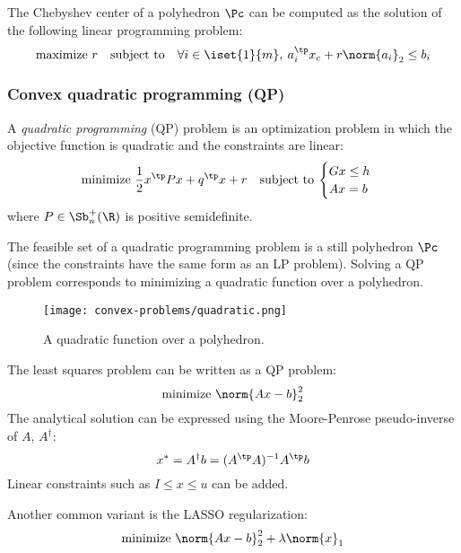 \begin{property}
    The Chebyshev center of a polyhedron $\Pc$ can be computed as the solution of the following linear programming problem:
    \begin{equation*}
        \text{maximize } r \quad\text{subject to}\quad \forall i\in\iset{1}{m}, \: a_i^\tp x_c + r\norm{a_i}_2\leq b_i
    \end{equation*}
\end{property}

\subsubsection{Convex quadratic programming (QP)}
\begin{definition}
    A \emph{quadratic programming} (QP) problem is an optimization problem in which the objective function is quadratic and the constraints are linear:
    \begin{equation*}
        \text{minimize } \frac{1}{2}x^\tp P x + q^\tp x + r\quad\text{subject to}\: \begin{cases}
            Gx\leq h\\
            Ax=b
        \end{cases}
    \end{equation*}
    where $P\in\Sb_n^+(\R)$ is positive semidefinite.

    The feasible set of a quadratic programming problem is a still polyhedron $\Pc$ (since the constraints have the same form as an LP problem). Solving a QP problem corresponds to minimizing a quadratic function over a polyhedron.

    \begin{figure}[H]
        \centering
        \texttt{[image: convex-problems/quadratic.png]}
        \caption{A quadratic function over a polyhedron.}
    \end{figure}
\end{definition}

\begin{example}
    The least squares problem can be written as a QP problem:
    \begin{equation*}
        \text{minimize } \norm{Ax-b}_2^2
    \end{equation*}
    The analytical solution can be expressed using the Moore-Penrose pseudo-inverse of $A$, $A^\dagger$:
    \begin{equation*}
        x^* = A^\dagger b = (A^\tp A)^{-1}A^\tp b
    \end{equation*}
    Linear constraints such as $I\leq x\leq u$ can be added. 

    Another common variant is the LASSO regularization:
    \begin{equation*}
        \text{minimize } \norm{Ax-b}_2^2 + \lambda\norm{x}_1
    \end{equation*}
\end{example}

